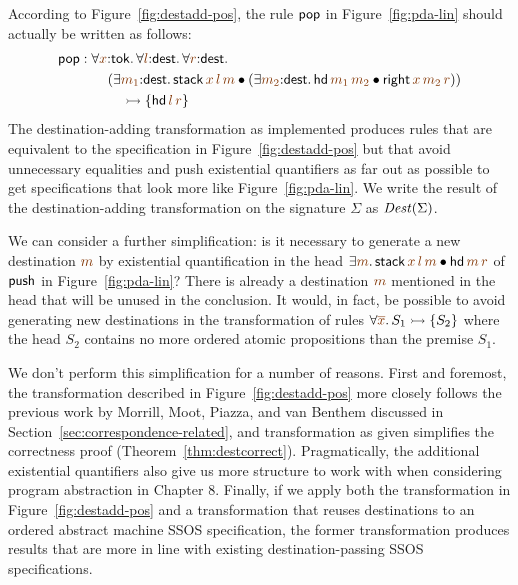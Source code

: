 According to Figure~\ref{fig:destadd-pos}, the rule 
${\sf pop}$ in Figure~\ref{fig:pda-lin} should actually be written as
follows:
\begin{align*} 
  {\sf pop} & : 
  \forall \lf x{:}{\sf tok}.\,
  \forall \lf l{:}{\sf dest}.\,
  \forall \lf r{:}{\sf dest}.\,
  \\
  & \qquad (\exists \lf{m_1}{:}{\sf dest}.\, {\sf stack}\,\lf{x}\,\lf{l}\,\lf{m} \fuse
   (\exists \lf{m_2}{:}{\sf dest}.\, {\sf hd}\,\lf{m_1}\,\lf{m_2} \fuse
     {\sf right}\,\lf{x}\,\lf{m_2}\,\lf{r}))
  \\ 
  & \qquad\quad \lefti
  \{ 
    {\sf hd}\,\lf{l}\,\lf{r}
  \}
\end{align*}
The destination-adding transformation as
implemented produces rules that are
equivalent to the specification in Figure~\ref{fig:destadd-pos}
but that avoid unnecessary equalities and push existential quantifiers
as far out as possible to get specifications that look more like
Figure~\ref{fig:pda-lin}. We write the result of the destination-adding
transformation on the signature $\Sigma$ as ${\it Dest}(\Sigma)$. 

We can consider a further simplification: is it necessary to generate
a new destination $\lf{m}$ by existential quantification in the head
$\exists \lf{m}.\,{\sf stack}\,\lf{x}\,\lf{l}\,\lf{m} \fuse {\sf hd}\,\lf{m}\,\lf{r}$ of ${\sf
  push}$ in Figure~\ref{fig:pda-lin}? There is already a destination
$\lf m$ mentioned in the head that will be unused in the conclusion.  It
would, in fact, be possible to avoid generating new destinations in
the transformation of rules $\forall \lf{\overline{x}}.\,S_1 \lefti \{ S_2
\}$ where the head $S_2$ contains no more ordered atomic propositions
than the premise $S_1$. 

We don't perform this simplification for a number of reasons. First
and foremost, the transformation described in
Figure~\ref{fig:destadd-pos} more closely follows the previous work by
Morrill, Moot, Piazza, and van Benthem discussed in
Section~\ref{sec:correspondence-related}, and transformation as given
simplifies the correctness proof (Theorem~\ref{thm:destcorrect}).
Pragmatically, the additional existential quantifiers also give us
more structure to work with when considering program abstraction in
Chapter 8. Finally, if we apply both the transformation in
Figure~\ref{fig:destadd-pos} and a transformation that reuses
destinations to an ordered abstract machine SSOS specification, the
former transformation produces results that are more in line with
existing destination-passing SSOS specifications.

